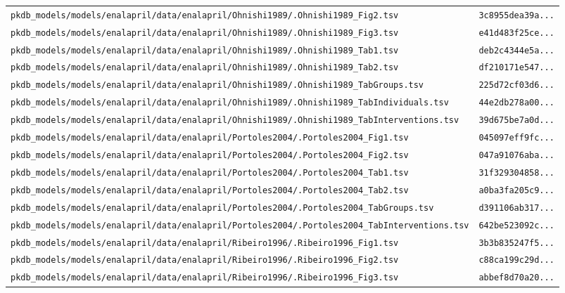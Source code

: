\documentclass{article}
\begin{document}
\begin{longtable}{ll}
\texttt{pkdb\_models/models/enalapril/data/enalapril/Ohnishi1989/.Ohnishi1989\_Fig2.tsv} & \texttt{3c8955dea39a...} \\
\texttt{pkdb\_models/models/enalapril/data/enalapril/Ohnishi1989/.Ohnishi1989\_Fig3.tsv} & \texttt{e41d483f25ce...} \\
\texttt{pkdb\_models/models/enalapril/data/enalapril/Ohnishi1989/.Ohnishi1989\_Tab1.tsv} & \texttt{deb2c4344e5a...} \\
\texttt{pkdb\_models/models/enalapril/data/enalapril/Ohnishi1989/.Ohnishi1989\_Tab2.tsv} & \texttt{df210171e547...} \\
\texttt{pkdb\_models/models/enalapril/data/enalapril/Ohnishi1989/.Ohnishi1989\_TabGroups.tsv} & \texttt{225d72cf03d6...} \\
\texttt{pkdb\_models/models/enalapril/data/enalapril/Ohnishi1989/.Ohnishi1989\_TabIndividuals.tsv} & \texttt{44e2db278a00...} \\
\texttt{pkdb\_models/models/enalapril/data/enalapril/Ohnishi1989/.Ohnishi1989\_TabInterventions.tsv} & \texttt{39d675be7a0d...} \\
\texttt{pkdb\_models/models/enalapril/data/enalapril/Portoles2004/.Portoles2004\_Fig1.tsv} & \texttt{045097eff9fc...} \\
\texttt{pkdb\_models/models/enalapril/data/enalapril/Portoles2004/.Portoles2004\_Fig2.tsv} & \texttt{047a91076aba...} \\
\texttt{pkdb\_models/models/enalapril/data/enalapril/Portoles2004/.Portoles2004\_Tab1.tsv} & \texttt{31f329304858...} \\
\texttt{pkdb\_models/models/enalapril/data/enalapril/Portoles2004/.Portoles2004\_Tab2.tsv} & \texttt{a0ba3fa205c9...} \\
\texttt{pkdb\_models/models/enalapril/data/enalapril/Portoles2004/.Portoles2004\_TabGroups.tsv} & \texttt{d391106ab317...} \\
\texttt{pkdb\_models/models/enalapril/data/enalapril/Portoles2004/.Portoles2004\_TabInterventions.tsv} & \texttt{642be523092c...} \\
\texttt{pkdb\_models/models/enalapril/data/enalapril/Ribeiro1996/.Ribeiro1996\_Fig1.tsv} & \texttt{3b3b835247f5...} \\
\texttt{pkdb\_models/models/enalapril/data/enalapril/Ribeiro1996/.Ribeiro1996\_Fig2.tsv} & \texttt{c88ca199c29d...} \\
\texttt{pkdb\_models/models/enalapril/data/enalapril/Ribeiro1996/.Ribeiro1996\_Fig3.tsv} & \texttt{abbef8d70a20...} \\

\end{longtable}
\end{document}
